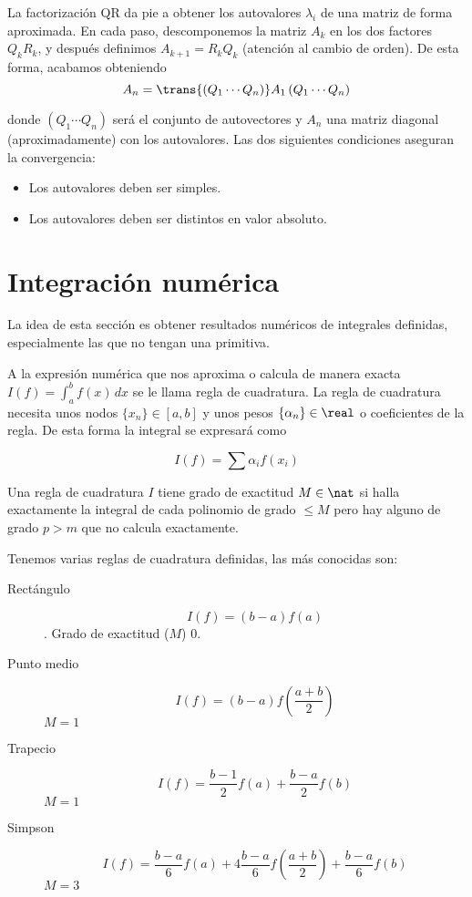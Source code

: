 \documentclass[nochap]{apuntes}
\begin{document}
La factorización QR da pie a obtener los autovalores $\lambda_i$ de una matriz de forma aproximada. En cada paso, descomponemos la matriz $A_k$ en los dos factores $Q_k R_k$, y después definimos $A_{k+1} = R_k Q_k$ (atención al cambio de orden). De esta forma, acabamos obteniendo \[ A_n = \trans{\left(Q_1\dotsb Q_n\right)} A_1 \left(Q_1\dotsb Q_n\right) \]

donde $\left(Q_1\dotsb Q_n\right)$ será el conjunto de autovectores y $A_n$ una matriz diagonal (aproximadamente) con los autovalores. Las dos siguientes condiciones aseguran la convergencia:

\begin{itemize}
\item Los autovalores deben ser simples.
\item Los autovalores deben ser distintos en valor absoluto.
\end{itemize}

\newpage
\printindex

\section{Integración numérica}

La idea de esta sección es obtener resultados numéricos de integrales definidas, especialmente las que no tengan una primitiva.

\begin{defn}
A la expresión numérica que nos aproxima o calcula de manera exacta $ I(f) = \int_a^bf(x)\,dx$ se le llama regla de cuadratura. La regla de cuadratura necesita unos nodos $\{x_n\} \in [a, b]$ y unos pesos $\{\alpha_n\}\in \real$ o coeficientes de la regla. De esta forma la integral se expresará como

\[ I(f) = \sum \alpha_i f(x_i) \]
\end{defn}

\begin{defn}
Una regla de cuadratura $I$ tiene grado de exactitud $M\in \nat$ si halla exactamente la integral de cada polinomio de grado $≤M$ pero hay alguno de grado $p>m$ que no calcula exactamente. 
\end{defn}

Tenemos varias reglas de cuadratura definidas, las más conocidas son:

\begin{description}
\item[Rectángulo] \[ I(f) = (b-a)f(a) \]. Grado de exactitud ($M$) 0.
\item[Punto medio] \[ I(f) = (b-a) f\left(\frac{a+b}{2}\right) \] $M = 1$
\item[Trapecio] \[ I(f) = \frac{b-1}{2}f(a) + \frac{b-a}{2} f(b) \] $M = 1$
\item[Simpson]\[ I(f) = \frac{b-a}{6}f(a) + 4\frac{b-a}{6}f\left(\frac{a+b}{2}\right) + \frac{b-a}{6}f(b) \] $M=3$
\end{description}
\end{document}
